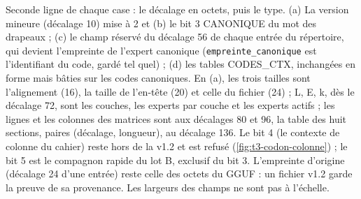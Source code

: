   {Seconde ligne de chaque case : le décalage en octets, puis le type. (a) La version mineure (décalage 10) mise à
   2 et (b) le bit 3 CANONIQUE du mot des drapeaux ; (c) le champ réservé du décalage 56 de chaque entrée du
   répertoire, qui devient l'empreinte de l'expert canonique (\texttt{empreinte\_canonique} est l'identifiant du
   code, gardé tel quel) ; (d) les tables CODES\_CTX, inchangées en forme mais bâties sur les codes canoniques.
   En (a), les trois tailles sont l'alignement (16), la taille de l'en-tête (20) et celle du fichier (24) ; L, E,
   k, dès le décalage 72, sont les couches, les experts par couche et les experts actifs ; les lignes et les
   colonnes des matrices sont aux décalages 80 et 96, la table des huit sections, paires (décalage, longueur), au
   décalage 136. Le bit 4 (le contexte de
   colonne du cahier) reste hors de la v1.2 et est refusé (\cref{fig:t3-codon-colonne}) ; le bit 5 est le
   compagnon rapide du lot B, exclusif du bit 3. L'empreinte d'origine (décalage 24 d'une entrée) reste celle des
   octets du GGUF : un fichier v1.2 garde la preuve de sa provenance. Les largeurs des champs ne sont pas à
   l'échelle.}
\fi
